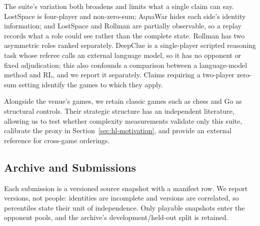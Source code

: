 The suite's variation both broadens and limits what a single claim can say. LostSpace
is four-player and non-zero-sum; AquaWar hides each side's identity information; and
LostSpace and Rollman are partially observable, so a replay records what a role could
see rather than the complete state. Rollman has two asymmetric roles ranked separately.
DeepClue is a single-player scripted reasoning task whose referee calls an external
language model, so it has no opponent or fixed adjudication; this also confounds a
comparison between a language-model method and RL, and we report it separately. Claims
requiring a two-player zero-sum setting identify the games to which they apply.

Alongside the venue's games, we retain classic games such as chess and Go as structural
controls. Their strategic structure has an independent literature, allowing us to test
whether complexity measurements validate only this suite, calibrate the proxy in
Section~\ref{sec:hl-motivation}, and provide an external reference for cross-game orderings.

\subsection{Archive and Submissions}
\label{sec:arena-archive}

Each submission is a versioned source snapshot with a manifest row. We report versions,
not people: identities are incomplete and versions are correlated, so percentiles state
their unit of independence. Only playable snapshots enter the opponent pools, and the
archive's development/held-out split is retained.

